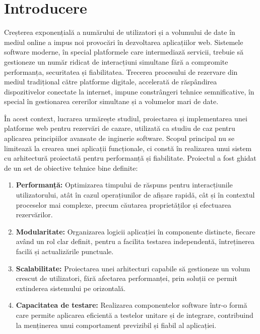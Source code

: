 \documentclass[12pt, a4paper, oneside, romanian]{teza-upb}
\begin{document}
\section{Introducere}
\label{sec:filozofie_arhitectura}

Creșterea exponențială a numărului de utilizatori și a volumului de date în mediul online a impus noi provocări în dezvoltarea aplicațiilor web. Sistemele software moderne, în special platformele care intermediază servicii, trebuie să gestioneze un număr ridicat de interacțiuni simultane fără a compromite performanța, securitatea și fiabilitatea. Trecerea procesului de rezervare din mediul tradițional către platforme digitale, accelerată de răspândirea dispozitivelor conectate la internet, impune constrângeri tehnice semnificative, în special în gestionarea cererilor simultane și a volumelor mari de date.

În acest context, lucrarea urmărește studiul, proiectarea și implementarea unei platforme web pentru rezervări de cazare, utilizată ca studiu de caz pentru aplicarea principiilor avansate de inginerie software. Scopul principal nu se limitează la crearea unei aplicații funcționale, ci constă în realizarea unui sistem cu arhitectură proiectată pentru performanță și fiabilitate. Proiectul a fost ghidat de un set de obiective tehnice bine definite:
\begin{enumerate}
	\item \textbf{Performanță:} Optimizarea timpului de răspuns pentru interacțiunile utilizatorului, atât în cazul operațiunilor de afișare rapidă, cât și în contextul proceselor mai complexe, precum căutarea proprietăților și efectuarea rezervărilor.
	
	\item \textbf{Modularitate:} Organizarea logicii aplicației în componente distincte, fiecare având un rol clar definit, pentru a facilita testarea independentă, întreținerea facilă și actualizările punctuale.
	
	\item \textbf{Scalabilitate:} Proiectarea unei arhitecturi capabile să gestioneze un volum crescut de utilizatori, fără afectarea performanței, prin soluții ce permit extinderea sistemului pe orizontală.
	
	\item \textbf{Capacitatea de testare:} Realizarea componentelor software într-o formă care permite aplicarea eficientă a testelor unitare și de integrare, contribuind la menținerea unui comportament previzibil și fiabil al aplicației.
\end{enumerate}
\end{document}
